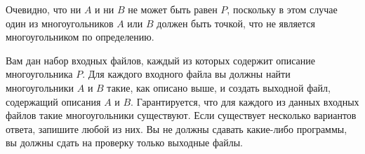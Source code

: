 Очевидно, что ни $A$ и ни $B$ не может быть равен $P$, поскольку в этом случае один из
многоугольников $A$ или $B$ должен быть точкой, что не является многоугольником по определению.

Вам дан набор входных файлов, каждый из которых содержит описание многоугольника $P$.
Для каждого входного файла вы должны найти многоугольники $A$ и $B$ такие, как описано выше,
и создать выходной файл, содержащий описания $A$ и $B$. Гарантируется, что для каждого из данных
входных файлов такие многоугольники существуют. Если существует несколько вариантов ответа,
запишите любой из них. Вы не должны сдавать какие-либо программы, вы должны сдать на проверку только выходные файлы. 